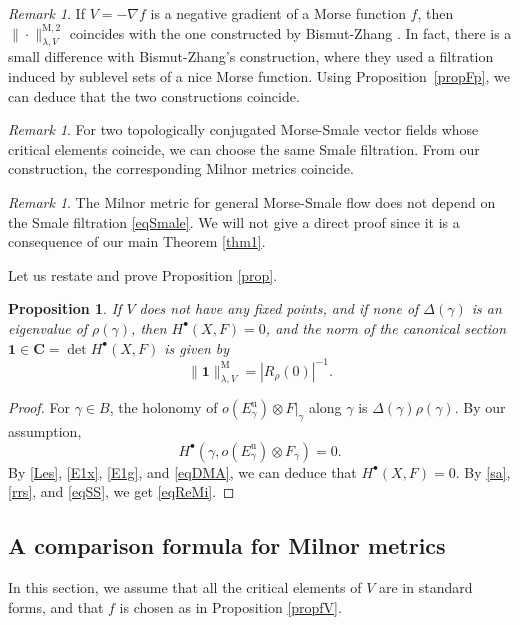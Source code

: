 \documentclass[11pt]{article}
\numberwithin{equation}{section}
\newcommand{\sbullet}{{\scriptscriptstyle\bullet}}
\newcommand{\ru}{\mathrm{u}}
\newcommand{\rM}{\mathrm{M}}
\theoremstyle{plain}
\newtheorem{prop}[lem]{Proposition}
\theoremstyle{definition}
\theoremstyle{remark}
\newtheorem{re}[lem]{Remark}
\newcommand{\bC}{\mathbf{C}}
\begin{document}
\begin{re}
If $V=-\nabla f$ is a negative gradient of a Morse function $f$, then
$\|{\cdot}\|^{\rM,2}_{\lambda,V}$ coincides with the one constructed by
Bismut-Zhang \cite[Def.\,1.9]{BZ92}.
In fact, there is a small difference with Bismut-Zhang's
construction, where they used a filtration \cite[(1.37)]{BZ92} induced
by sublevel sets of a nice Morse function. Using Proposition~\ref{propFp}, we can deduce that the two constructions coincide.
\end{re}

\begin{re}\label{reDMA}
For two topologically conjugated Morse-Smale vector fields whose
critical elements coincide, we can choose the same Smale filtration. From our construction, the corresponding Milnor metrics coincide.
\end{re}

\begin{re}
The Milnor metric for
general Morse-Smale flow does not depend on the Smale
filtration \eqref{eqSmale}. We will not give a direct proof since it is a consequence of our main Theorem \ref{thm1}.
\end{re}

Let us restate and prove Proposition \ref{prop}.

\begin{prop}\label{Prop}
If $V$ does not have any fixed points, and
if none of $\Delta(\gamma)$ is an eigenvalue of $\rho(\gamma)$, then
$H^{\sbullet}(X,F)=0$, and the norm of the canonical section
$\mathbf{1}\in \bC=\det H^{\sbullet}(X,F)$ is given by
\begin{equation}\label{eqReMi}
\|\mathbf{1}\|^{\rM}_{\lambda,V}=|R_{\rho}(0)|^{-1}.
\end{equation}
\end{prop}
\begin{proof}
For $\gamma\in B$, the holonomy of $o(E_{\gamma}^{\ru})\otimes
F|_{\gamma}$
along $\gamma$ is $\Delta(\gamma)\rho(\gamma)$. By our
assumption,
\begin{equation}\label{eqDMA}
H^{\sbullet}(\gamma,o(E_{\gamma}^{\ru})\otimes
F_{\gamma})=0.
\end{equation}
By \eqref{Les}, \eqref{E1x}, \eqref{E1g}, and \eqref{eqDMA}, we can deduce that $H^{\sbullet}(X,F)=0$. By
\eqref{sa}, \eqref{rrs}, and \eqref{eqSS}, we get
\eqref{eqReMi}.
\end{proof}

\subsection{A comparison formula for Milnor metrics}\label{sCMM}
In this section, we assume that all the critical elements of
$V$ are in standard forms, and that $f$ is chosen as in
Proposition \ref{propfV}.
\end{document}
